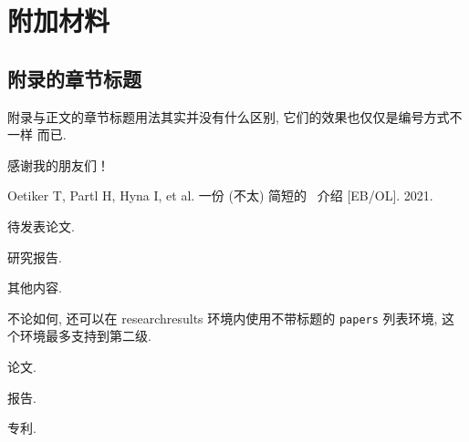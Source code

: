 \documentclass[draft,newenv,newcmd]{ncuthesis}
\begin{document}
\chapter{附加材料}
\section{附录的章节标题}
附录与正文的章节标题用法其实并没有什么区别, 它们的效果也仅仅是编号方式不一样
而已. 
\backmatter

\begin{acknowledgements}
感谢我的朋友们！
\end{acknowledgements}
\begin{researchresults}
\begin{published}
\item Oetiker T, Partl H, Hyna I, et al. 一份 (不太) 简短的
\LaTeXe\ 介绍 [EB/OL]. 2021.
\end{published}
\begin{tobepublished}
\item 待发表论文. 
\end{tobepublished}
\begin{reports}
\item 研究报告. 
\end{reports}
\begin{others}[另外还有]
\item 其他内容. 
\end{others}
不论如何, 还可以在 \textsf{researchresults} 环境内使用不带标题的
\texttt{papers} 列表环境, 这个环境最多支持到第二级. 
\begin{papers}
\item 论文.
\item 报告.
  \begin{papers}
    \item 专利. 
  \end{papers}
\end{papers}
\end{researchresults}
\end{document}
